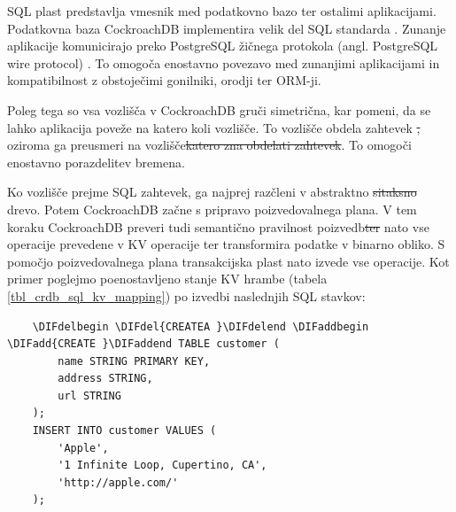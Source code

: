 \documentclass[a4paper, 12pt]{book}
\providecommand{\DIFaddtex}[1]{{\protect\color{blue}\uwave{#1}}} %
\providecommand{\DIFdeltex}[1]{{\protect\color{red}\sout{#1}}}                      %
\providecommand{\DIFaddbegin}{} %
\providecommand{\DIFaddend}{} %
\providecommand{\DIFdelbegin}{} %
\providecommand{\DIFdelend}{} %
\providecommand{\DIFadd}[1]{\texorpdfstring{\DIFaddtex{#1}}{#1}} %
\providecommand{\DIFdel}[1]{\texorpdfstring{\DIFdeltex{#1}}{}} %
\newcommand{\DIFscaledelfig}{0.5}
\newlength{\DIFdelgraphicswidth} %
\newlength{\DIFdelgraphicsheight} %
\newcommand{\DIFaddincludegraphics}[2][]{{\color{blue}\fbox{\DIFOincludegraphics[#1]{#2}}}} %
\newcommand{\DIFdelincludegraphics}[2][]{%
\sbox{\DIFdelgraphicsbox}{\DIFOincludegraphics[#1]{#2}}%
\settoboxwidth{\DIFdelgraphicswidth}{\DIFdelgraphicsbox} %
\settoboxtotalheight{\DIFdelgraphicsheight}{\DIFdelgraphicsbox} %
\scalebox{\DIFscaledelfig}{%
\parbox[b]{\DIFdelgraphicswidth}{\usebox{\DIFdelgraphicsbox}\\[-\baselineskip] \rule{\DIFdelgraphicswidth}{0em}}\llap{\resizebox{\DIFdelgraphicswidth}{\DIFdelgraphicsheight}{%
\setlength{\unitlength}{\DIFdelgraphicswidth}%
\begin{picture}(1,1)%
\thicklines\linethickness{2pt} %
{\color[rgb]{1,0,0}\put(0,0){\framebox(1,1){}}}%
{\color[rgb]{1,0,0}\put(0,0){\line( 1,1){1}}}%
{\color[rgb]{1,0,0}\put(0,1){\line(1,-1){1}}}%
\end{picture}%
}\hspace*{3pt}}} %
} %
\DeclareRobustCommand{\DIFaddbegin}{\DIFOaddbegin \let\includegraphics\DIFaddincludegraphics} %
\DeclareRobustCommand{\DIFaddend}{\DIFOaddend \let\includegraphics\DIFOincludegraphics} %
\DeclareRobustCommand{\DIFdelbegin}{\DIFOdelbegin \let\includegraphics\DIFdelincludegraphics} %
\DeclareRobustCommand{\DIFdelend}{\DIFOaddend \let\includegraphics\DIFOincludegraphics} %
\begin{document}
SQL plast predstavlja vmesnik med podatkovno bazo ter ostalimi aplikacijami.  Podatkovna baza CockroachDB implementira velik del SQL standarda \cite{CRDB-sql-standard}. Zunanje aplikacije komunicirajo preko PostgreSQL žičnega protokola (angl. PostgreSQL wire protocol) \cite{psql-wire-protocol}. To omogoča enostavno povezavo med zunanjimi aplikacijami in kompatibilnost z obstoječimi gonilniki, orodji ter ORM-ji.

Poleg tega so vsa vozlišča v CockroachDB gruči simetrična, kar pomeni, da se lahko aplikacija poveže na katero koli vozlišče. To vozlišče obdela zahtevek \DIFdelbegin \DIFdel{, }\DIFdelend oziroma ga preusmeri na vozlišče\DIFdelbegin \DIFdel{katero zna obdelati zahtevek}\DIFdelend \DIFaddbegin \DIFadd{, katero ga zna obdelati}\DIFaddend . To omogoči enostavno porazdelitev bremena.

Ko vozlišče prejme SQL zahtevek, ga najprej razčleni v abstraktno \DIFdelbegin \DIFdel{sitaksno }\DIFdelend \DIFaddbegin \DIFadd{sintaksno }\DIFaddend drevo. Potem CockroachDB začne s pripravo poizvedovalnega plana. V tem koraku CockroachDB preveri tudi semantično pravilnost poizvedb\DIFdelbegin \DIFdel{ter }\DIFdelend \DIFaddbegin \DIFadd{, }\DIFaddend nato vse operacije prevedene v KV operacije ter transformira podatke v binarno obliko. S pomočjo poizvedovalnega plana transakcijska plast nato izvede vse operacije. Kot primer poglejmo poenostavljeno stanje KV hrambe (tabela \ref{tbl_crdb_sql_kv_mapping}) po izvedbi naslednjih SQL stavkov:

\begin{listing}[H]
\begin{verbatim}
    \DIFdelbegin \DIFdel{CREATEA }\DIFdelend \DIFaddbegin \DIFadd{CREATE }\DIFaddend TABLE customer (
        name STRING PRIMARY KEY,
        address STRING,
        url STRING
    );
    INSERT INTO customer VALUES (
        'Apple',
        '1 Infinite Loop, Cupertino, CA',
        'http://apple.com/'
    );
\end{verbatim}
\label{sql-example-sql-mapping}
\end{listing}
\end{document}
